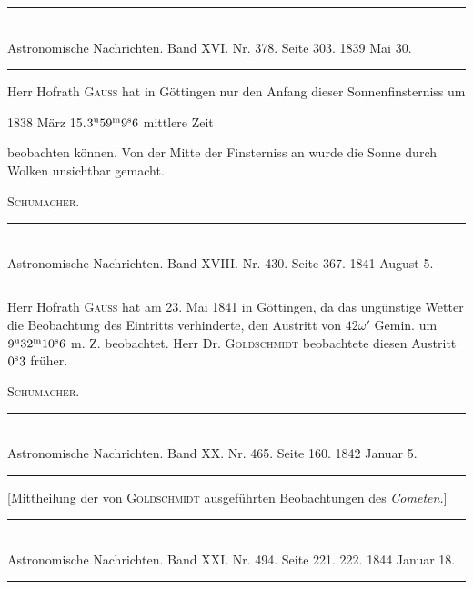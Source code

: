 \clearpage
{}
\begin{center}
\rule{0.55\linewidth}{0.4pt}\\[2pt]
Astronomische Nachrichten. Band XVI. Nr. 378. Seite 303. 1839 Mai 30.\\[2pt]
\rule{0.55\linewidth}{0.4pt}
\end{center}

Herr Hofrath \textsc{Gauss} hat in Göttingen nur den Anfang dieser Sonnenfinsterniss um
\begin{center}1838 März 15.\quad $3^{\rm u}59^{\rm m}9^{\rm s}6$ mittlere Zeit\end{center}
\noindent beobachten können. Von der Mitte der Finsterniss an wurde die Sonne durch Wolken unsichtbar gemacht.
\begin{flushright}\textsc{Schumacher.}\end{flushright}

\clearpage
\hypertarget{native-469-occultation}{}
\begin{center}
\rule{0.55\linewidth}{0.4pt}\\[2pt]
Astronomische Nachrichten. Band XVIII. Nr. 430. Seite 367. 1841 August 5.\\[2pt]
\rule{0.55\linewidth}{0.4pt}
\end{center}

Herr Hofrath \textsc{Gauss} hat am 23. Mai 1841 in Göttingen, da das ungünstige Wetter die Beobachtung des Eintritts verhinderte, den Austritt von $42\omega'$ Gemin. um $9^{\rm u}32^{\rm m}10^{\rm s}6$ m. Z. beobachtet. Herr Dr. \textsc{Goldschmidt} beobachtete diesen Austritt $0^{\rm s}3$ früher.
\begin{flushright}\textsc{Schumacher.}\end{flushright}

\clearpage
\hypertarget{native-469-notice1842}{}
\begin{center}
\rule{0.55\linewidth}{0.4pt}\\[2pt]
Astronomische Nachrichten. Band XX. Nr. 465. Seite 160. 1842 Januar 5.\\[2pt]
\rule{0.55\linewidth}{0.4pt}
\end{center}

[Mittheilung der von \textsc{Goldschmidt} ausgeführten Beobachtungen des \emph{Cometen.}]

\bigskip
\hypertarget{native-469-notice1844}{}
\begin{center}
\rule{0.55\linewidth}{0.4pt}\\[2pt]
Astronomische Nachrichten. Band XXI. Nr. 494. Seite 221. 222. 1844 Januar 18.\\[2pt]
\rule{0.55\linewidth}{0.4pt}
\end{center}

